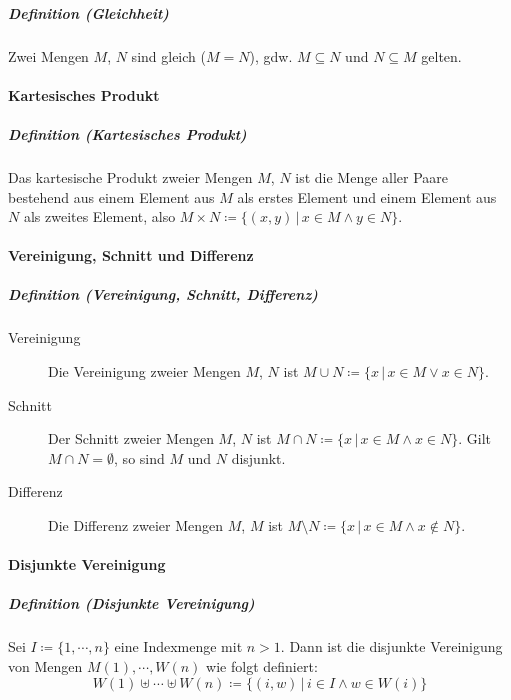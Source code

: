 \documentclass[a4paper, 11pt, accentcolor = tud3b]{tudreport}
\newcommand{\forwhich}{\ensuremath{{\,\vert\,}}}
\newcommand{\definition}[2]{\subparagraph{Definition (#1)} #2}
\begin{document}
				\definition{Gleichheit}{Zwei Mengen $ M $, $ N $ sind gleich ($ M = N $), gdw. $ M \subseteq N $ und $ N \subseteq M $ gelten.}
		    
		    \paragraph{Kartesisches Produkt}
			    \definition{Kartesisches Produkt}{Das kartesische Produkt zweier Mengen $ M $, $ N $ ist die Menge aller Paare bestehend aus einem Element aus $ M $ als erstes Element und einem Element aus $ N $ als zweites Element, also $ M \times N \coloneqq \{ (x, y) \forwhich x \in M \land y \in N \} $.}

		    \paragraph{Vereinigung, Schnitt und Differenz}
			    \definition{Vereinigung, Schnitt, Differenz}{
				    \begin{description}
				    	\item[Vereinigung] Die Vereinigung zweier Mengen $ M $, $ N $ ist $ M \cup N \coloneqq \{ x \forwhich x \in M \lor x \in N \} $.
				    	\item[Schnitt] Der Schnitt zweier Mengen $ M $, $ N $ ist $ M \cap N \coloneqq \{ x \forwhich x \in M \land x \in N \} $. Gilt $ M \cap N = \emptyset $, so sind $ M $ und $ N $ disjunkt.
				    	\item[Differenz] Die Differenz zweier Mengen $ M $, $ M $ ist $ M \setminus N \coloneqq \{ x \forwhich x \in M \land x \not\in N \} $.
				    \end{description}
				}
		    
		    \paragraph{Disjunkte Vereinigung}
			    \definition{Disjunkte Vereinigung}{
				    Sei $ I \coloneqq \{ 1, \cdots, n \} $ eine Indexmenge mit $ n > 1 $. Dann ist die disjunkte Vereinigung von Mengen $ M(1), \cdots, W(n) $ wie folgt definiert:
				    \begin{equation*}
					    W(1) \uplus \cdots \uplus W(n) \coloneqq \{ (i, w) \forwhich i \in I \land w \in W(i) \}
				    \end{equation*}
				}
		    
\end{document}
